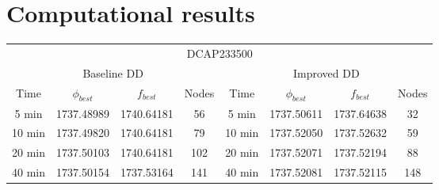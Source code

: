 \section{Computational results}

\begin{footnotesize}
\begin{tabular}{cccc|cccc}
\multicolumn{8}{c}{DCAP233500}\\
\multicolumn{4}{c}{Baseline DD} & \multicolumn{4}{c}{Improved DD}\\
Time & $\phi_{best}$ & $f_{best}$ & Nodes & Time & $\phi_{best}$ & $f_{best}$ & Nodes \\
\hline
5 min & 1737.48989 & 1740.64181 & 56 & 5 min & 1737.50611 & 1737.64638 & 32 \\
10 min & 1737.49820 & 1740.64181 & 79 & 10 min &1737.52050 &1737.52632 & 59 \\
20 min & 1737.50103 & 1740.64181 & 102 & 20 min & 1737.52071 & 1737.52194 & 88\\
40 min & 1737.50154 & 1737.53164 & 141 & 40 min & 1737.52081 & 1737.52115 & 148 
\end{tabular}
\end{footnotesize}

